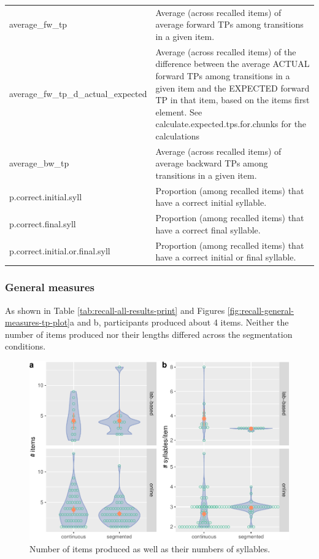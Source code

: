 \documentclass[
]{article}
\begin{document}
\begin{longtable}[t]{l>{\raggedright\arraybackslash}p{30em}}
average\_fw\_tp & Average (across recalled items) of average forward TPs among transitions in a given item.\\
average\_fw\_tp\_d\_actual\_expected & Average (across recalled items) of the difference between the average ACTUAL forward TPs among transitions in a given item and the EXPECTED forward TP in that item, based on the items first element. See calculate.expected.tps.for.chunks for the calculations\\
average\_bw\_tp & Average (across recalled items) of average backward TPs among transitions in a given item.\\
\addlinespace
p.correct.initial.syll & Proportion (among recalled items) that have a correct initial syllable.\\
p.correct.final.syll & Proportion (among recalled items) that have a correct final syllable.\\
p.correct.initial.or.final.syll & Proportion (among recalled items) that have a correct initial or final syllable.\\
\bottomrule
\end{longtable}

\subsubsection{General measures}\label{general-measures}

As shown in Table \ref{tab:recall-all-results-print} and Figures
\ref{fig:recall-general-measures-tp-plot}a and b, participants produced
about 4 items. Neither the number of items produced nor their lengths
differed across the segmentation conditions.

\begin{figure}

{\centering \includegraphics[width=0.8\linewidth]{segmentation_recall_combined_for_revision4_files/figure-latex/recall-general-measures-plot-1} 

}

\caption{Number of items produced as well as their numbers of syllables.}\label{fig:recall-general-measures-plot}
\end{figure}
\end{document}
